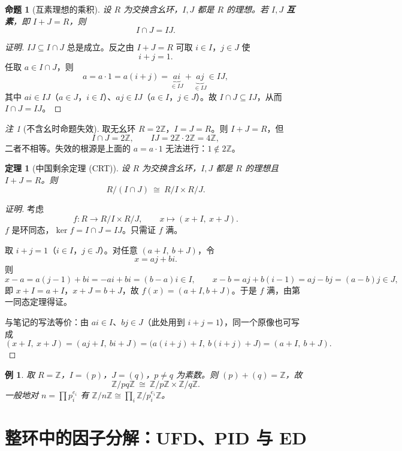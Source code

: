 \documentclass[11pt,a4paper]{ctexart}
\newtheorem*{theorem}{定理}
\newtheorem*{example}{例}
\newtheorem*{proposition}{命题}
\theoremstyle{remark}
\newtheorem*{remark}{注}
\begin{document}
\begin{proposition}[互素理想的乘积]
设 $R$ 为交换含幺环，$I,J$ 都是 $R$ 的理想。若 $I,J$ \textbf{互素}，即 $I+J=R$，则
\[
I\cap J=IJ .
\]
\end{proposition}

\begin{proof}[证明]
$IJ\subseteq I\cap J$ 总是成立。反之由 $I+J=R$ 可取 $i\in I$，$j\in J$ 使
\[
i+j=1 .
\]
任取 $a\in I\cap J$，则
\[
a=a\cdot 1=a(i+j)=\underbrace{ai}_{\in IJ}+\underbrace{aj}_{\in IJ}\in IJ,
\]
其中 $ai\in IJ$（$a\in J$，$i\in I$）、$aj\in IJ$（$a\in I$，$j\in J$）。故 $I\cap J\subseteq IJ$，从而 $I\cap J=IJ$。
\end{proof}

\begin{remark}[不含幺时命题失效]
取无幺环 $R=2\mathbb{Z}$，$I=J=R$。则 $I+J=R$，但
\[
I\cap J=2\mathbb{Z},\qquad IJ=2\mathbb{Z}\cdot 2\mathbb{Z}=4\mathbb{Z},
\]
二者不相等。失效的根源是上面的 $a=a\cdot 1$ 无法进行：$1\notin 2\mathbb{Z}$。
\end{remark}

\begin{theorem}[中国剩余定理 (CRT)]
设 $R$ 为交换含幺环，$I,J$ 都是 $R$ 的理想且 $I+J=R$。则
\[
R/(I\cap J)\ \cong\ R/I\times R/J .
\]
\end{theorem}

\begin{proof}[证明]
考虑
\[
f:R\to R/I\times R/J,\qquad x\mapsto (x+I,\ x+J).
\]
$f$ 是环同态，$\ker f=I\cap J=IJ$。只需证 $f$ 满。

取 $i+j=1$（$i\in I$，$j\in J$）。对任意 $(a+I,\ b+J)$，令
\[
x=aj+bi .
\]
则
\[
x-a=a(j-1)+bi=-ai+bi=(b-a)i\in I,\qquad
x-b=aj+b(i-1)=aj-bj=(a-b)j\in J,
\]
即 $x+I=a+I$，$x+J=b+J$，故 $f(x)=(a+I,b+J)$。于是 $f$ 满，由第一同态定理得证。

与笔记的写法等价：由 $ai\in I$、$bj\in J$（此处用到 $i+j=1$），同一个原像也可写成
\[
(x+I,\ x+J)=(aj+I,\ bi+J)=\bigl(a(i+j)+I,\ b(i+j)+J\bigr)=(a+I,\ b+J).
\]
\end{proof}

\begin{example}
取 $R=\mathbb{Z}$，$I=(p)$，$J=(q)$，$p\neq q$ 为素数。则 $(p)+(q)=\mathbb{Z}$，故
\[
\mathbb{Z}/pq\mathbb{Z}\ \cong\ \mathbb{Z}/p\mathbb{Z}\times\mathbb{Z}/q\mathbb{Z}.
\]
一般地对 $n=\prod p_i^{e_i}$ 有 $\mathbb{Z}/n\mathbb{Z}\cong\prod_i\mathbb{Z}/p_i^{e_i}\mathbb{Z}$。
\end{example}

\section*{整环中的因子分解：UFD、PID 与 ED}
\end{document}
